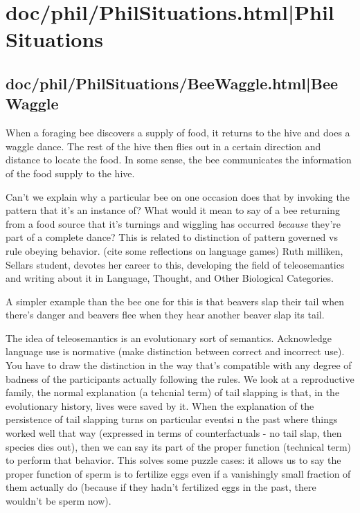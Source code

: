 \documentclass[12pt,a4paper]{report}
\begin{document}
\chapter{doc/phil/PhilSituations.html|Phil Situations}

\section{doc/phil/PhilSituations/BeeWaggle.html|Bee Waggle}
When a foraging bee discovers a supply of food, it returns to the hive and does
a waggle dance. The rest of the hive then flies out in a certain direction and
distance to locate the food. In some sense, the bee communicates the information
of the food supply to the hive.

Can't we explain why a particular bee on one
occasion does that by invoking the pattern that
it's an instance of? What would it mean to say of
a bee returning from a food source that it's
turnings and wiggling has occurred \emph{because}
they're part of a complete dance? This is related
to distinction of pattern governed vs rule
obeying behavior. (cite some reflections on
language games) Ruth milliken, Sellars student,
devotes her career to this, developing the field
of teleosemantics and writing about it in
Language, Thought, and Other Biological
Categories.

A simpler example than the bee one for this is
that beavers slap their tail when there's danger
and beavers flee when they hear another beaver
slap its tail.

The idea of teleosemantics is an evolutionary
sort of semantics. Acknowledge language use is
normative (make distinction between correct and
incorrect use). You have to draw the distinction
in the way that's compatible with any degree of
badness of the participants actually following
the rules. We look at a reproductive family, the
normal explanation (a tehcnial term) of tail
slapping is that, in the evolutionary history,
lives were saved by it. When the explanation of
the persistence of tail slapping turns on
particular eventsi n the past where things worked
well that way (expressed in terms of
counterfactuals - no tail slap, then species dies
out), then we can say its part of the proper
function (technical term) to perform that
behavior. This  solves some puzzle cases: it
allows us to say the proper function of sperm is
to fertilize eggs even if a vanishingly small
fraction of them actually do (because if they
hadn't fertilized eggs in the past, there
wouldn't be sperm now).
\end{document}
